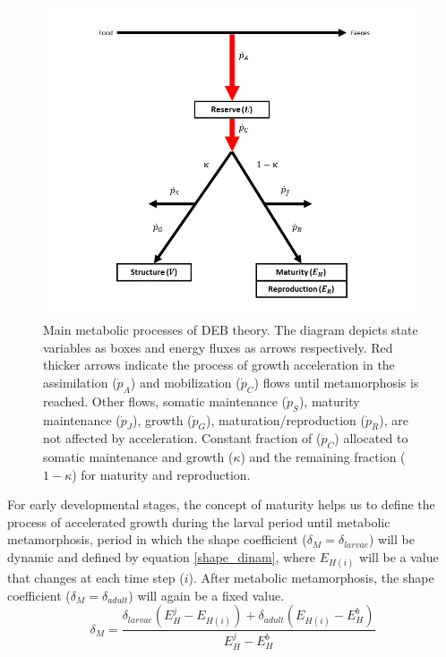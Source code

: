\begin{figure}[ht]
	\includegraphics[width=1.0\textwidth]{figures/Chap4DEBfluxbox.png}
	\centering
	\caption{Main metabolic processes of DEB theory. The diagram depicts state variables as boxes and energy fluxes as arrows respectively. Red thicker arrows indicate the process of growth acceleration in the assimilation ($\dot{p}_{A}$) and mobilization ($\dot{p}_{C}$) flows until metamorphosis is reached. Other flows, somatic maintenance ($\dot{p}_{S}$), maturity maintenance ($\dot{p}_{J}$), growth ($\dot{p}_{G}$), maturation/reproduction ($\dot{p}_{R}$), are not affected by acceleration. Constant fraction of ($\dot{p}_{C}$) allocated to somatic maintenance and growth ($\kappa$) and the remaining fraction ($1-\kappa$) for maturity and reproduction.}
	\label{Chap4DEBfluxbox}
\end{figure}

For early developmental stages, the concept of maturity helps us to define the process of accelerated growth during the larval period until metabolic metamorphosis, period in which the shape coefficient ($\delta_{M} = \delta_{larvae}$) will be dynamic and defined by equation \ref{shape_dinam}, where $E_{H(i)}$ will be a value that changes at each time step ($i$). After metabolic metamorphosis, the shape coefficient ($\delta_{M} = \delta_{adult}$) will again be a fixed value.\\

\begin{equation}
	\delta_M = \frac{\delta_{larvae} (E_H^j - E_{H(i)}) + \delta_{adult} (E_{H(i)} - E_H^b)}
	{E_H^j - E_H^b}
	\label{shape_dinam}
\end{equation}\\

